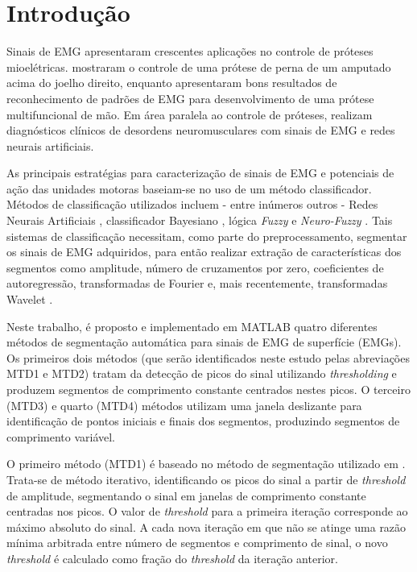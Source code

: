 	\chapter{Introdução}
Sinais de EMG apresentaram crescentes aplicações no controle de próteses mioelétricas. \cite{Hargrove2013} mostraram o controle de uma prótese de perna de um amputado acima do joelho direito, enquanto \cite{Jun-UkChu2007} apresentaram bons resultados de reconhecimento de padrões de EMG para desenvolvimento de uma prótese multifuncional de mão. Em área paralela ao controle de próteses, \cite{Pattichis1995} realizam diagnósticos clínicos de desordens neuromusculares com sinais de EMG e redes neurais artificiais.

As principais estratégias para caracterização de sinais de EMG e potenciais de ação das unidades motoras baseiam-se no uso de um método classificador. Métodos de classificação utilizados incluem - entre inúmeros outros - Redes Neurais Artificiais \cite{Hudgins1993}, classificador Bayesiano \cite{Englehart2003}, lógica \emph{Fuzzy} \cite{Chan2000} e \emph{Neuro-Fuzzy} \cite{Favieiro2011}. Tais sistemas de classificação necessitam, como parte do preprocessamento, segmentar os sinais de EMG adquiridos, para então realizar extração de características dos segmentos como amplitude, número de cruzamentos por zero, coeficientes de autoregressão, transformadas de Fourier e, mais recentemente, transformadas Wavelet \cite{Jun-UkChu2007}.

Neste trabalho, é proposto e implementado em MATLAB quatro diferentes métodos de segmentação automática para sinais de EMG de superfície (EMGs). Os primeiros dois métodos (que serão identificados neste estudo pelas abreviações MTD1 e MTD2) tratam da detecção de picos do sinal utilizando \emph{thresholding} e produzem segmentos de comprimento constante centrados nestes picos. O terceiro (MTD3) e quarto (MTD4) métodos utilizam uma janela deslizante para identificação de pontos iniciais e finais dos segmentos, produzindo segmentos de comprimento variável.

O primeiro método (MTD1) é baseado no método de segmentação utilizado em \cite{Chauvet2001}. Trata-se de método iterativo, identificando os picos do sinal a partir de \emph{threshold} de amplitude, segmentando o sinal em janelas de comprimento constante centradas nos picos. O valor de \emph{threshold} para a primeira iteração corresponde ao máximo absoluto do sinal. A cada nova iteração em que não se atinge uma razão mínima arbitrada entre número de segmentos e comprimento de sinal, o novo \emph{threshold} é calculado como fração do \emph{threshold} da iteração anterior.


